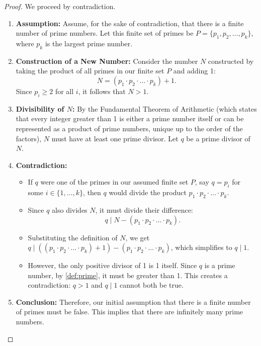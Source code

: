 \documentclass[11pt, a4paper]{article}
\theoremstyle{plain} %
\theoremstyle{definition} %
\theoremstyle{remark} %
\begin{document}
\begin{proof}
    We proceed by contradiction.
    \begin{enumerate}
        \item \textbf{Assumption:} Assume, for the sake of contradiction, that there is a finite number of prime numbers. Let this finite set of primes be \( P = \{p_1, p_2, \dots, p_k\} \), where \( p_k \) is the largest prime number.

        \item \textbf{Construction of a New Number:} Consider the number \( N \) constructed by taking the product of all primes in our finite set \( P \) and adding 1:
        \[ N = (p_1 \cdot p_2 \cdot \dots \cdot p_k) + 1. \]
        Since \( p_i \ge 2 \) for all \( i \), it follows that \( N > 1 \).

        \item \textbf{Divisibility of \( N \):} By the Fundamental Theorem of Arithmetic (which states that every integer greater than 1 is either a prime number itself or can be represented as a product of prime numbers, unique up to the order of the factors), \( N \) must have at least one prime divisor. Let \( q \) be a prime divisor of \( N \).

        \item \textbf{Contradiction:}
        \begin{itemize}
            \item If \( q \) were one of the primes in our assumed finite set \( P \), say \( q = p_i \) for some \( i \in \{1, \dots, k\} \), then \( q \) would divide the product \( p_1 \cdot p_2 \cdot \dots \cdot p_k \).
            \item Since \( q \) also divides \( N \), it must divide their difference:
            \[ q \mid N - (p_1 \cdot p_2 \cdot \dots \cdot p_k). \]
            \item Substituting the definition of \( N \), we get \( q \mid ((p_1 \cdot p_2 \cdot \dots \cdot p_k) + 1) - (p_1 \cdot p_2 \cdot \dots \cdot p_k) \), which simplifies to \( q \mid 1 \).
            \item However, the only positive divisor of 1 is 1 itself. Since \( q \) is a prime number, by \ref{def:prime}, it must be greater than 1. This creates a contradiction: \( q > 1 \) and \( q \mid 1 \) cannot both be true.
        \end{itemize}

        \item \textbf{Conclusion:} Therefore, our initial assumption that there is a finite number of primes must be false. This implies that there are infinitely many prime numbers.
    \end{enumerate}
\end{proof}
\end{document}
